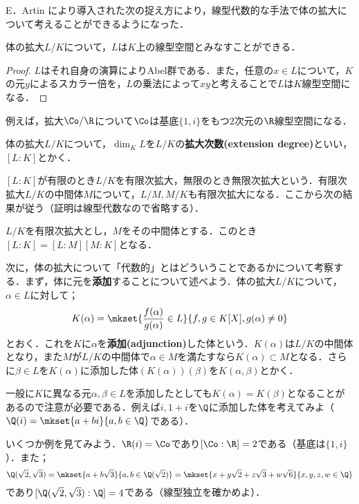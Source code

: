 E．Artin により導入された次の捉え方により，線型代数的な手法で体の拡大について考えることができるようになった．

\begin{prop}
	体の拡大$L/K$について，$L$は$K$上の線型空間とみなすことができる．
\end{prop}

\begin{proof}
	$L$はそれ自身の演算によりAbel群である．また，任意の$x\in L$について，$K$の元$y$によるスカラー倍を，$L$の乗法によって$xy$と考えることで$L$は$K$線型空間になる．
\end{proof}

例えば，拡大$\Co/\R$について$\Co$は基底$\{1,i\}$をもつ$2$次元の$\R$線型空間になる．

\begin{defi}[拡大次数]
	体の拡大$L/K$について，$\dim_K L$を$L/K$の\textbf{拡大次数(extension degree)}といい，$[L:K]$とかく．
\end{defi}

$[L:K]$が有限のとき$L/K$を有限次拡大，無限のとき無限次拡大という．有限次拡大$L/K$の中間体$M$について，$L/M,M/K$も有限次拡大になる．ここから次の結果が従う（証明は線型代数なので省略する）．

\begin{prop}
	$L/K$を有限次拡大とし，$M$をその中間体とする．このとき$[L:K]=[L:M][M:K]$となる．
\end{prop}

次に，体の拡大について「代数的」とはどういうことであるかについて考察する．まず，体に元を\textbf{添加}することについて述べよう．体の拡大$L/K$について，$\alpha\in L$に対して；
\[K(\alpha)=\mkset{\frac{f(\alpha)}{g(\alpha)}\in L}{f,g\in K[X],g(\alpha)\neq0}\]
とおく．これを$K$に$\alpha$を\textbf{添加(adjunction)}した体という．$K(\alpha)$は$L/K$の中間体となり，また$M$が$L/K$の中間体で$\alpha\in M$を満たすなら$K(\alpha)\subset M$となる．さらに$\beta\in L$を$K(\alpha)$に添加した体$(K(\alpha))(\beta)$を$K(\alpha,\beta)$とかく．

一般に$K$に異なる元$\alpha,\beta\in L$を添加したとしても$K(\alpha)=K(\beta)$となることがあるので注意が必要である．例えば$i,1+i$を$\Q$に添加した体を考えてみよ（$\Q(i)=\mkset{a+bi}{a,b\in\Q}$である）．

いくつか例を見てみよう．$\R(i)=\Co$であり$[\Co:\R]=2$である（基底は$\{1,i\}$）．また；
\[\Q(\sqrt{2},\sqrt{3})=\mkset{a+b\sqrt{3}}{a,b\in\Q(\sqrt{2})}=\mkset{x+y\sqrt{2}+z\sqrt{3}+w\sqrt{6}}{x,y,z,w\in\Q}\]
であり$[\Q(\sqrt{2},\sqrt{3}):\Q]=4$である（線型独立を確かめよ）．

